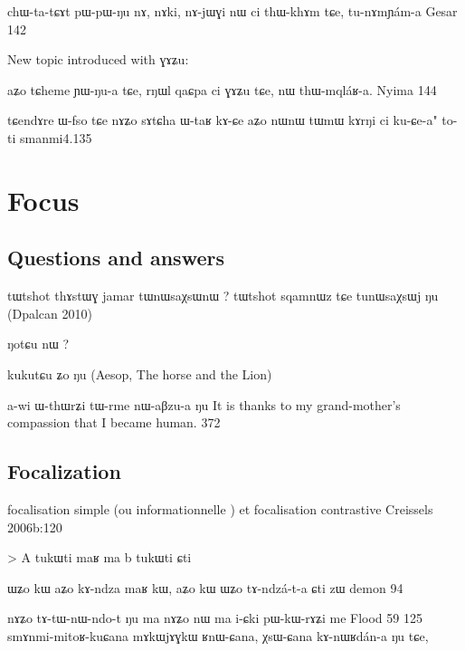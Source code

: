 \documentclass[oldfontcommands,oneside,a4paper,11pt]{memoir}
\newcommand{\ipa}[1]{{\phon #1}} %
\begin{document}
chɯ-ta-tɕɤt	pɯ-pɯ-ŋu	nɤ,	nɤki,	nɤ-jɯɣi	nɯ	ci	thɯ-khɤm	tɕe,	tu-nɤmɲám-a
Gesar 142

New topic introduced with \ipa{ɣɤʑu}:

aʑo	tɕheme	ɲɯ-ŋu-a	tɕe,	rŋɯl	qaɕpa	ci	ɣɤʑu	tɕe,	nɯ	thɯ-mqláʁ-a.
Nyima 144


tɕendɤre ɯ-fso tɕe nɤʑo sɤtɕha ɯ-taʁ kɤ-ɕe 
aʑo nɯnɯ tɯmɯ kɤrŋi ci ku-ɕe-a" to-ti
smanmi4.135
\section{Focus}

\subsection{Questions and answers}
tɯtshot thɤstɯɣ jamar tɯnɯsaχsɯnɯ ?
tɯtshot sqamnɯz tɕe tunɯsaχsɯj ŋu
(Dpalcan 2010)

ŋotɕu nɯ ?

kukutɕu ʑo ŋu
(Aesop, The horse and the Lion)
 
a-wi	ɯ-thɯrʑi	tɯ-rme	nɯ-aβzu-a	ŋu
It is thanks to my grand-mother's compassion that I became human.
372

\subsection{Focalization}
focalisation simple (ou informationnelle ) et focalisation contrastive
Creissels 2006b:120


> A tukɯti maʁ ma b tukɯti ɕti



ɯʑo	kɯ	aʑo	kɤ-ndza	maʁ	kɯ, aʑo	kɯ	ɯʑo	tɤ-ndzá-t-a	ɕti	zɯ
demon 94

nɤʑo	tɤ-tɯ-nɯ-ndo-t	ŋu	ma	nɤʑo	nɯ	ma	i-ɕki	pɯ-kɯ-rɤʑi	me
Flood 59
125	smɤnmi-mitoʁ-kuɕana	mɤkɯjɤɣkɯ	ʁnɯ-ɕana,	χsɯ-ɕana	kɤ-nɯʁdán-a	ŋu	tɕe,
\end{document}
